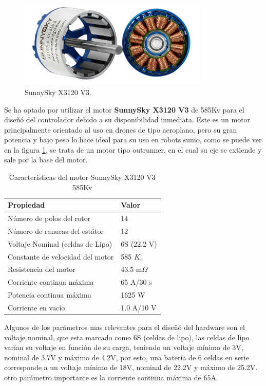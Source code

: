 \documentclass[11pt]{report}
\begin{document}
\begin{figure}[ht]
	\centering
	\includegraphics[width=0.8\textwidth]{imagenes/Motor/X3120.png}
	\caption{SunnySky X3120 V3.}
	\label{X3120}
\end{figure}
\FloatBarrier
\newpage
Se ha optado por utilizar el motor \textbf{SunnySky X3120 V3} de 585Kv para el diseñó del controlador debido a su disponibilidad inmediata. Este es un motor principalmente orientado al uso en drones de tipo aeroplano, pero su gran potencia y bajo peso lo hace ideal para su uso en robots sumo, como se puede ver en la figura \ref{X3120}, se trata de un motor tipo outrunner, en el cual su eje se extiende y sale por la base del motor.

\begin{table}[h!]
	\centering
	\caption{Características del motor SunnySky X3120 V3 585Kv}
	\begin{tabular}{l l}
		\hline
		\textbf{Propiedad}               & \textbf{Valor} \\
		\hline
		Número de polos del rotor        & 14             \\
		Número de ranuras del estátor    & 12             \\
		Voltaje Nominal (celdas de Lipo) & 6S (22.2 V)    \\
		Constante de velocidad del motor & 585 $K_v$      \\
		Resistencia del motor            & 43.5 m$\Omega$ \\
		Corriente continua máxima        & 65 A/30 s      \\
		Potencia continua máxima         & 1625 W         \\
		Corriente en vacío               & 1.0 A/10 V     \\
		\hline
	\end{tabular}
\end{table}
\FloatBarrier

Algunos de los parámetros mas relevantes para el diseñó del hardware son el voltaje nominal, que esta marcado como 6S (celdas de lipo), las celdas de lipo varían su voltaje en función de su carga, teniendo un voltaje mínimo de 3V, nominal de 3.7V y máximo de 4.2V, por esto, una batería de 6 celdas en serie corresponde a un voltaje mínimo de 18V, nominal de 22.2V y máximo de 25.2V. otro parámetro importante es la corriente continua máxima de 65A.
\end{document}

